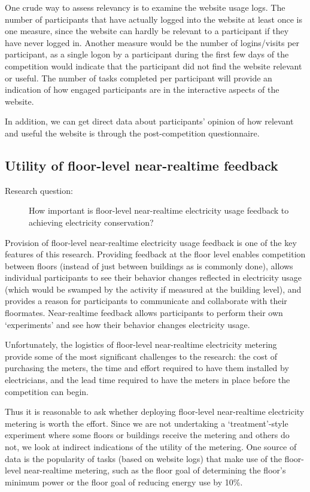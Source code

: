 One crude way to assess relevancy is to examine the website usage logs. The number of participants that have actually logged into the website at least once is one measure, since the website can hardly be relevant to a participant if they have never logged in. Another measure would be the number of logins/visits per participant, as a single logon by a participant during the first few days of the competition would indicate that the participant did not find the website relevant or useful. The number of tasks completed per participant will provide an indication of how engaged participants are in the interactive aspects of the website.

In addition, we can get direct data about participants' opinion of how relevant and useful the website is through the post-competition questionnaire.

\subsection{Utility of floor-level near-realtime feedback}

\begin{description}
\item[Research question:] How important is floor-level near-realtime electricity usage feedback to achieving electricity conservation?
\end{description}

Provision of floor-level near-realtime electricity usage feedback is one of the key features of this research. Providing feedback at the floor level enables competition between floors (instead of just between buildings as is commonly done), allows individual participants to see their behavior changes reflected in electricity usage (which would be swamped by the activity if measured at the building level), and provides a reason for participants to communicate and collaborate with their floormates. Near-realtime feedback allows participants to perform their own `experiments' and see how their behavior changes electricity usage.

Unfortunately, the logistics of floor-level near-realtime electricity metering provide some of the most significant challenges to the research: the cost of purchasing the meters, the time and effort required to have them installed by electricians, and the lead time required to have the meters in place before the competition can begin.

Thus it is reasonable to ask whether deploying floor-level near-realtime electricity metering is worth the effort. Since we are not undertaking a `treatment'-style experiment where some floors or buildings receive the metering and others do not, we look at indirect indications of the utility of the metering. One source of data is the popularity of tasks (based on website logs) that make use of the floor-level near-realtime metering, such as the floor goal of determining the floor's minimum power or the floor goal of reducing energy use by 10\%.

